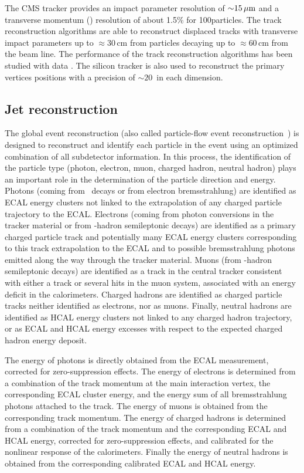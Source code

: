 The CMS tracker provides an impact parameter resolution of ${\sim}15\,\mu\text{m}$ and a transverse momentum (\pt) resolution of about 1.5\% for 100\GeV particles. 
The track reconstruction algorithms are able to reconstruct displaced tracks with transverse impact
parameters up to ${\approx}30$\,cm from particles decaying up to ${\approx}60$\,cm from the beam line.  The
performance of the track reconstruction algorithms has been studied with data
\cite{Khachatryan:2010pw}. 
The silicon
tracker is also used to reconstruct the primary vertices positions with a
precision of ${\sim}20$~\mum in each dimension.

\subsection{Jet reconstruction}

The global event reconstruction (also called particle-flow event reconstruction~\cite{CMS-PAS-PFT-09-001,CMS-PAS-PFT-10-001}) is designed to reconstruct and identify each particle in the event using an optimized combination of all subdetector information. 
In this process, the identification of the particle type (photon, electron, muon, charged hadron, neutral hadron) plays an important role in the determination of the particle direction and energy. Photons (\eg coming from \Pgpz\ decays or from electron bremsstrahlung) are identified as ECAL energy clusters not linked to the extrapolation of any charged particle trajectory to the ECAL. Electrons (\eg coming from photon conversions in the tracker material or from \cPqb-hadron semileptonic decays) are identified as a primary charged particle track and potentially many ECAL energy clusters corresponding to this track extrapolation to the ECAL and to possible bremsstrahlung photons emitted along the way through the tracker material. Muons (\eg from \cPqb-hadron semileptonic decays) are identified as a track in the central tracker consistent with either a track or several hits in the muon system, associated with an energy deficit in the calorimeters. Charged hadrons are identified as charged particle tracks neither identified as electrons, nor as muons. Finally, neutral hadrons are identified as HCAL energy clusters not linked to any charged hadron trajectory, or as ECAL and HCAL energy excesses with respect to the expected charged hadron energy deposit. 

The energy of photons is directly obtained from the ECAL measurement, corrected for zero-suppression effects. The energy of electrons is determined from a combination of the track momentum at the main interaction vertex, the corresponding ECAL cluster energy, and the energy sum of all bremsstrahlung photons attached to the track. The energy of muons is obtained from the corresponding track momentum. The energy of charged hadrons is determined from a combination of the track momentum and the corresponding ECAL and HCAL energy, corrected for zero-suppression effects, and calibrated for the nonlinear response of the calorimeters. Finally the energy of neutral hadrons is obtained from the corresponding calibrated ECAL and HCAL energy. 

